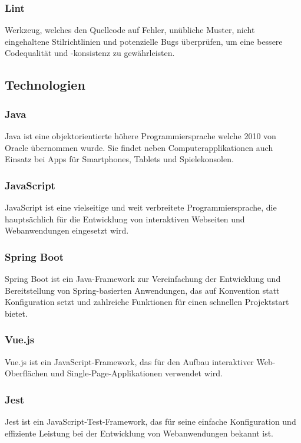 \subsubsection{Lint}
Werkzeug, welches den Quellcode auf Fehler, unübliche Muster, nicht eingehaltene Stilrichtlinien und potenzielle Bugs
überprüfen, um eine bessere Codequalität und -konsistenz zu gewährleisten.


\subsection{Technologien}

\subsubsection{Java}
Java ist eine objektorientierte höhere Programmiersprache welche 2010 von Oracle übernommen wurde.
Sie findet neben Computerapplikationen auch Einsatz bei Apps für Smartphones, Tablets und Spielekonsolen.

\subsubsection{JavaScript}
JavaScript ist eine vielseitige und weit verbreitete Programmiersprache, die hauptsächlich für die Entwicklung von
interaktiven Webseiten und Webanwendungen eingesetzt wird.

\subsubsection{Spring Boot}
Spring Boot ist ein Java-Framework zur Vereinfachung der Entwicklung und Bereitstellung von Spring-basierten
Anwendungen, das auf Konvention statt Konfiguration setzt und zahlreiche Funktionen für einen schnellen Projektstart
bietet.

\subsubsection{Vue.js}
Vue.js ist ein JavaScript-Framework, das für den Aufbau interaktiver Web-Oberflächen und Single-Page-Applikationen verwendet wird.

\subsubsection{Jest}
Jest ist ein JavaScript-Test-Framework, das für seine einfache Konfiguration und effiziente Leistung bei der Entwicklung
von Webanwendungen bekannt ist.


